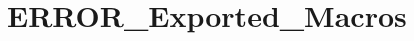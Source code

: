 \hypertarget{group___e_r_r_o_r___exported___macros}{}\section{E\+R\+R\+O\+R\+\_\+\+Exported\+\_\+\+Macros}
\label{group___e_r_r_o_r___exported___macros}
